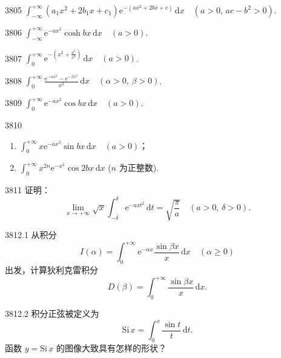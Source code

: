 \begin{prob}[S]{3805}
$\displaystyle \int_{-\infty}^{+\infty} (a_1 x^2 + 2b_1 x + c_1)\mathrm{e}^{-(ax^2+2bx+c)} \,\mathrm{d}x \quad (a>0,\, ac-b^2>0)$.
\end{prob}

\begin{prob}[S]{3806}
$\displaystyle \int_{-\infty}^{+\infty} \mathrm{e}^{-ax^2} \cosh bx \,\mathrm{d}x \quad (a>0)$.
\end{prob}

\begin{prob}[S]{3807}
$\displaystyle \int_0^{+\infty} \mathrm{e}^{-\left(x^2+\frac{a^2}{x^2}\right)} \,\mathrm{d}x \quad (a>0)$.
\end{prob}

\begin{prob}[S]{3808}
$\displaystyle \int_0^{+\infty} \frac{\mathrm{e}^{-\alpha x^2}-\mathrm{e}^{-\beta x^2}}{x^2} \,\mathrm{d}x \quad (\alpha>0,\, \beta>0)$.
\end{prob}

\begin{prob}[S]{3809}
$\displaystyle \int_0^{+\infty} \mathrm{e}^{-ax^2} \cos bx \,\mathrm{d}x \quad (a>0)$.
\end{prob}

\begin{prob}[M]{3810}
\begin{enumerate}[label=(\alph*), itemsep=2pt, topsep=3pt]
\item $\displaystyle \int_0^{+\infty} x\mathrm{e}^{-ax^2} \sin bx \,\mathrm{d}x \quad (a>0)$；
\item $\displaystyle \int_0^{+\infty} x^{2n}\mathrm{e}^{-x^2} \cos 2bx \,\mathrm{d}x$ ($n$ 为正整数).
\end{enumerate}
\end{prob}

\begin{prob}[M]{3811}
证明：
\[
\lim_{x\to+\infty} \sqrt{x} \int_{-\delta}^{\delta} \mathrm{e}^{-axt^2} \,\mathrm{d}t = \sqrt{\frac{\pi}{a}} \quad (a>0,\, \delta>0).
\]
\end{prob}

\begin{prob}[M]{3812.1}
从积分
\[
I(\alpha) = \int_0^{+\infty} \mathrm{e}^{-\alpha x} \frac{\sin\beta x}{x} \,\mathrm{d}x \quad (\alpha\geqslant 0)
\]
出发，计算狄利克雷积分
\[
D(\beta) = \int_0^{+\infty} \frac{\sin\beta x}{x} \,\mathrm{d}x.
\]
\end{prob}

\begin{prob}[M]{3812.2}
积分正弦被定义为
\[
\mathrm{Si}\,x = \int_0^x \frac{\sin t}{t} \,\mathrm{d}t.
\]
函数 $y = \mathrm{Si}\,x$ 的图像大致具有怎样的形状？
\end{prob}

